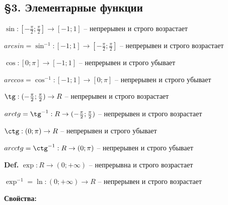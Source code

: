 \documentclass[14pt, letter paper]{article}
\begin{document}
\begin{center}
    \subsection*{\S 3. Элементарные функции}
\end{center}

$\sin : [-\frac{\pi}{2}; \frac{\pi}{2}] \rightarrow [-1; 1]$ -- непрерывен и строго возрастает

$arcsin = \sin^{-1} : [-1; 1] \rightarrow [-\frac{\pi}{2}; \frac{\pi}{2}]$ -- непрерывен и строго возрастает

$\cos : [0; \pi] \rightarrow [-1; 1]$ -- непрерывен и строго убывает

$arccos = \cos^{-1} : [-1; 1] \rightarrow [0; \pi]$ -- непрерывен и строго убывает

$\tg : (-\frac{\pi}{2}; \frac{\pi}{2}) \rightarrow R$ -- непрерывен и строго возрастает

$arctg = \tg^{-1} : R \rightarrow (-\frac{\pi}{2}; \frac{\pi}{2})$ -- непрерывен и строго возрастает

$\ctg : (0; \pi) \rightarrow R$ -- непрерывен и строго убывает

$arcctg = \ctg^{-1} : R \rightarrow (0; \pi)$ -- непрерывен и строго убывает

\vspace{5mm}

\textbf{Def.} $\exp : R \rightarrow (0; + \infty)$ -- непрерывна и строго возрастает

$\exp^{-1} = \ln : (0; + \infty) \rightarrow R$ -- непрерывен и строго возрастает

\textbf{Свойства:}
\end{document}

